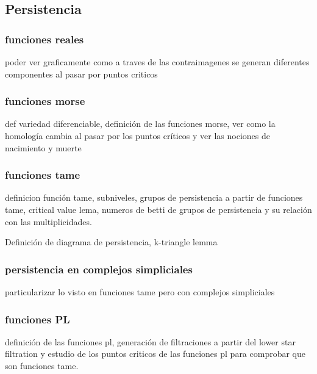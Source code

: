 \subsection{Persistencia}

\subsubsection*{funciones reales}
poder ver graficamente como a traves de las contraimagenes se generan diferentes componentes al pasar por puntos criticos
\subsubsection*{funciones morse} 
def variedad diferenciable, definición de las funciones morse, ver como la homología cambia al pasar por los puntos críticos y ver las nociones de nacimiento y muerte
\subsubsection*{funciones tame}
definicion función tame, subniveles, grupos de persistencia a partir de funciones tame, critical value lema,  numeros de betti de grupos de persistencia y su relación con las multiplicidades.

Definición de diagrama de persistencia, k-triangle lemma


\subsubsection*{persistencia en complejos simpliciales}
particularizar lo visto en funciones tame pero con complejos simpliciales

\subsubsection*{funciones PL}
definición de las funciones pl, generación de filtraciones a partir del lower star filtration y estudio de los puntos criticos  de las funciones pl para comprobar que son funciones tame.



